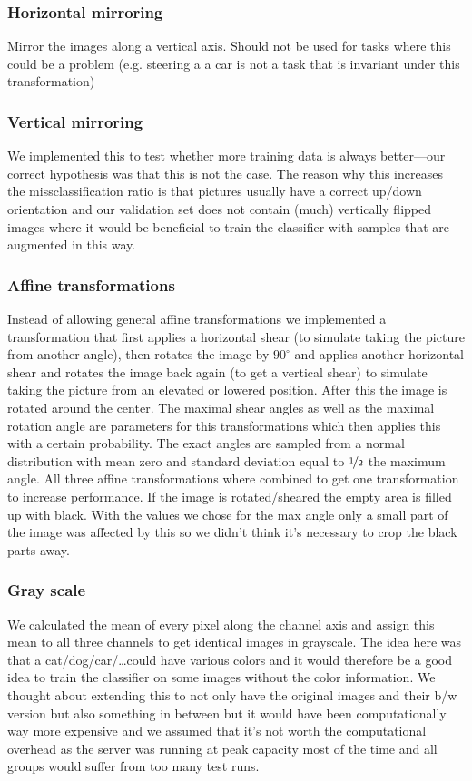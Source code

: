 \subsubsection{Horizontal mirroring} Mirror the images along a vertical axis. Should not be used for tasks where this could be a problem (e.g. steering a a car is not a task that is invariant under this transformation)
\subsubsection{Vertical mirroring} We implemented this to test whether more training data is always better---our correct hypothesis was that this is not the case. The reason why this increases the missclassification ratio is that pictures usually have a correct up/down orientation and our validation set does not contain (much) vertically flipped images where it would be beneficial to train the classifier with samples that are augmented in this way. 
\subsubsection{Affine transformations} Instead of allowing general affine transformations we implemented a transformation that first applies a horizontal shear (to simulate taking the picture from another angle), then rotates the image by $90^\circ$ and applies another horizontal shear and rotates the image back again (to get a vertical shear) to simulate taking the picture from an elevated or lowered position. After this the image is rotated around the center. The maximal shear angles as well as the maximal rotation angle are parameters for this transformations which then applies this with a certain probability. The exact angles are sampled from a normal distribution with mean zero and standard deviation equal to $\nicefrac 1 2$ the maximum angle. All three affine transformations where combined to get one transformation to increase performance. If the image is rotated/sheared the empty area is filled up with black. With the values we chose for the max angle only a small part of the image was affected by this so we didn't think it's necessary to crop the black parts away.
\subsubsection{Gray scale} We calculated the mean of every pixel along the channel axis and assign this mean to all three channels to get identical images in grayscale. The idea here was that a cat/dog/car/\ldots could have various colors and it would therefore be a good idea to train the classifier on some images without the color information. We thought about extending this to not only have the original images and their b/w version but also something in between but it would have been computationally way more expensive and we assumed that it's not worth the computational overhead as the server was running at peak capacity most of the time and all groups would suffer from too many test runs.
